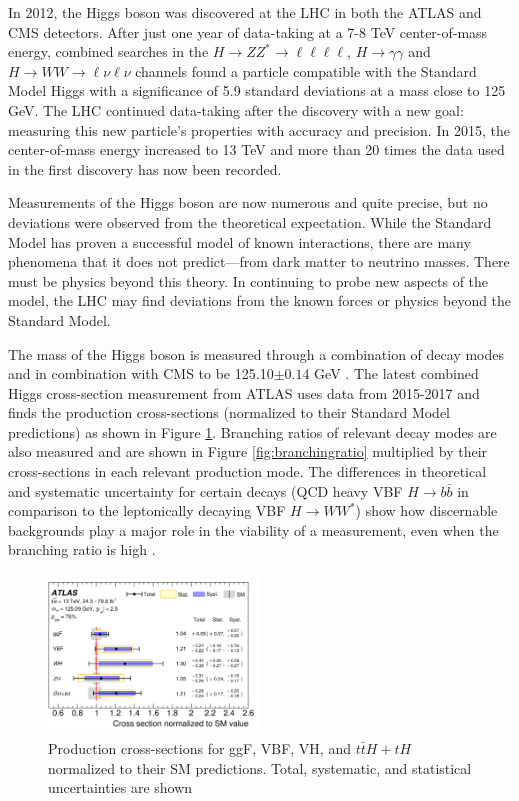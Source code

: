 In 2012, the Higgs boson was discovered at the LHC in both the ATLAS and CMS detectors. After just one year of data-taking at a 7-8 TeV center-of-mass energy, combined searches in the $H\rightarrow ZZ^*\rightarrow \ell\ell\ell\ell$, $H\rightarrow \gamma\gamma$ and $H\rightarrow WW \rightarrow \ell\nu\ell\nu$ channels found a particle compatible with the Standard Model Higgs with a significance of 5.9 standard deviations at a mass close to 125 GeV. The LHC continued data-taking after the discovery with a new goal: measuring this new particle's properties with accuracy and precision. In 2015, the center-of-mass energy increased to 13 TeV and more than 20 times the data used in the first discovery has now been recorded. 

Measurements of the Higgs boson are now numerous and quite precise, but no deviations were observed from the theoretical expectation. While the Standard Model has proven a successful model of known interactions, there are many phenomena that it does not predict---from dark matter to neutrino masses. There must be physics beyond this theory. In continuing to probe new aspects of the model, the LHC may find deviations from the known forces or physics beyond the Standard Model.

The mass of the Higgs boson is measured through a combination of decay modes and in combination with CMS to be 125.10$\pm 0.14$ GeV \cite{PDG}. The latest combined Higgs cross-section measurement from ATLAS uses data from 2015-2017 and finds the production cross-sections (normalized to their Standard Model predictions) as shown in Figure \ref{fig:productioncrosssection}. Branching ratios of relevant decay modes are also measured and are shown in Figure \ref{fig:branchingratio} multiplied by their cross-sections in each relevant production mode. The differences in theoretical and systematic uncertainty for certain decays (QCD heavy VBF $H\rightarrow b\bar{b}$ in comparison to the leptonically decaying VBF $H\rightarrow WW^*$) show how discernable backgrounds play a major role in the viability of a measurement, even when the branching ratio is high \cite{HiggsCurrent}.  
\begin{figure}[H]
        \centering
    \includegraphics[width=0.5\textwidth] {Pictures/productioncrosssection.png}\hspace{1cm}
    \caption{Production cross-sections for ggF, VBF, VH, and $t\bar{t}H+tH$ normalized to their SM predictions. Total, systematic, and statistical uncertainties are shown \cite{HiggsCurrent}}
    \label{fig:productioncrosssection}
\end{figure}

